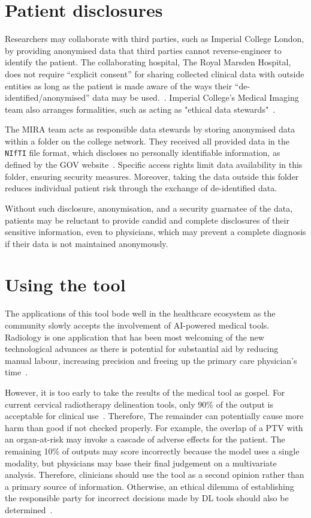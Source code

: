 \documentclass[12pt,twoside]{report}
\begin{document}
\section{Patient disclosures}

Researchers may collaborate with third parties, such as Imperial College London, by providing anonymised data that third parties cannot reverse-engineer to identify the patient. The collaborating hospital, The Royal Marsden Hospital, does not require ``explicit consent'' for sharing collected clinical data with outside entities as long as the patient is made aware of the ways their ``de-identified/anonymised'' data may be used.~\cite{royal-marsden-privacy-note}. Imperial College's Medical Imaging team also arranges formalities, such as acting as "ethical data stewards"~\cite{Larson2020-ib}. 

The MIRA team acts as responsible data stewards by storing anonymised data within a folder on the college network. They received all provided data in the \texttt{NIfTI} file format, which discloses no personally identifiable information, as defined by the GOV website~\cite{gov-gdpr}. Specific access rights limit data availability in this folder, ensuring security measures. Moreover, taking the data outside this folder reduces individual patient risk through the exchange of de-identified data.

Without such disclosure, anonymisation, and a security guarnatee of the data, patients may be reluctant to provide candid and complete disclosures of their sensitive information, even to physicians, which may prevent a complete diagnosis if their data is not maintained anonymously.

\section{Using the tool}\label{sect:using-the-tool}

The applications of this tool bode well in the healthcare ecosystem as the community slowly accepts the involvement of AI-powered medical tools. Radiology is one application that has been most welcoming of the new technological advances as there is potential for substantial aid by reducing manual labour, increasing precision and freeing up the primary care physician's time~\cite{Amisha2019-ki}.

However, it is too early to take the results of the medical tool as gospel. For current cervical radiotherapy delineation tools, only 90\% of the output is acceptable for clinical use~\cite{LIU2020172}. Therefore, The remainder can potentially cause more harm than good if not checked properly. For example, the overlap of a PTV with an organ-at-risk may invoke a cascade of adverse effects for the patient. The remaining 10\% of outputs may score incorrectly because the model uses a single modality, but physicians may base their final judgement on a multivariate analysis. Therefore, clinicians should use the tool as a second opinion rather than a primary source of information. Otherwise, an ethical dilemma of establishing the responsible party for incorrect decisions made by DL tools should also be determined~\cite{Chen2021-dg}.
\end{document}
